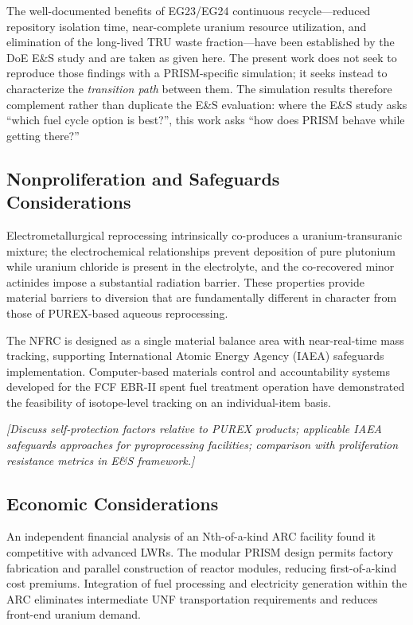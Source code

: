 \documentclass[10pt,twoside]{article}
\newcommand{\placeholder}[1]{%
  \textcolor{placeholder}{\textit{[#1]}}}
\begin{document}
The well-documented benefits of EG23/EG24 continuous recycle---reduced
repository isolation time, near-complete uranium resource utilization,
and elimination of the long-lived TRU waste fraction---have been
established by the DoE E\&S study and are taken as given
here.\cite{DOE_ES_2014,Triplett2012,Till2011}
The present work does not seek to reproduce those findings with a
PRISM-specific simulation; it seeks instead to characterize the
\textit{transition path} between them.  The simulation results
therefore complement rather than duplicate the E\&S evaluation:
where the E\&S study asks ``which fuel cycle option is best?'',
this work asks ``how does PRISM behave while getting there?''

\subsection{Nonproliferation and Safeguards Considerations}

Electrometallurgical reprocessing intrinsically co-produces a
uranium-transuranic mixture; the electrochemical relationships
prevent deposition of pure plutonium while uranium chloride is
present in the electrolyte, and the co-recovered minor actinides
impose a substantial radiation barrier.\cite{Till2011,Triplett2012}
These properties provide material barriers to diversion that are
fundamentally different in character from those of PUREX-based
aqueous reprocessing.

The NFRC is designed as a single material balance area with near-real-time
mass tracking, supporting International Atomic Energy Agency (IAEA)
safeguards implementation.\cite{Till2011}  Computer-based materials
control and accountability systems developed for the FCF EBR-II
spent fuel treatment operation have demonstrated the feasibility of
isotope-level tracking on an individual-item basis.

\placeholder{Discuss self-protection factors relative to PUREX products;
  applicable IAEA safeguards approaches for pyroprocessing facilities;
  comparison with proliferation resistance metrics in E\&S framework.}

\subsection{Economic Considerations}

An independent financial analysis of an Nth-of-a-kind ARC facility
found it competitive with advanced LWRs.\cite{Triplett2012}  The modular
PRISM design permits factory fabrication and parallel construction of
reactor modules, reducing first-of-a-kind cost premiums.  Integration
of fuel processing and electricity generation within the ARC eliminates
intermediate UNF transportation requirements and reduces front-end
uranium demand.
\end{document}

